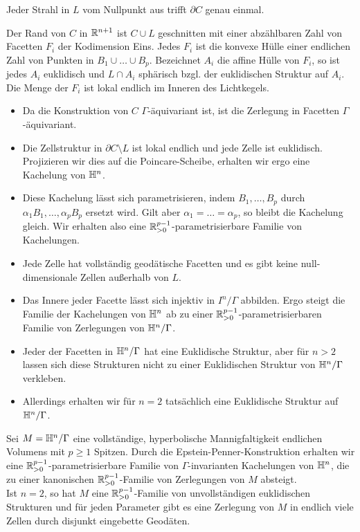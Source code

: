 \documentclass{book}
\begin{document}
\Lem{}
Jeder Strahl in $L$ vom Nullpunkt aus trifft $\partial C$ genau einmal.

\Prop{}
Der Rand von $C$ in $\mathbb{R}^{n+1}$ ist $C \cup L$ geschnitten mit einer abzählbaren Zahl von Facetten $F_i$ der Kodimension Eins. Jedes $F_i$ ist die konvexe Hülle einer endlichen Zahl von Punkten in $B_1\cup\ldots \cup B_p$. Bezeichnet $A_i$ die affine Hülle von $F_i$, so ist jedes $A_i$ euklidisch und $L\cap A_i$ sphärisch bzgl. der euklidischen Struktur auf $A_i$. Die Menge der $F_i$ ist lokal endlich im Inneren des Lichtkegels.

\Bem{}
\begin{itemize}
	\item Da die Konstruktion von $C$ $\Gamma$-äquivariant ist, ist die Zerlegung in Facetten $\Gamma$-äquivariant.
	\item Die Zellstruktur in $\partial C \setminus L$ ist lokal endlich und jede Zelle ist euklidisch. Projizieren wir dies auf die Poincare-Scheibe, erhalten wir ergo eine Kachelung von $\mathbb{H}^n$.
	\item Diese Kachelung lässt sich parametrisieren, indem $B_1,\ldots, B_p$ durch $\alpha_1B_1,\ldots, \alpha_p B_p$ ersetzt wird. Gilt aber $\alpha_1 = \ldots = \alpha_p$, so bleibt die Kachelung gleich. Wir erhalten also eine $\mathbb{R}_{> 0}^{p-1}$-parametrisierbare Familie von Kachelungen.
	\item Jede Zelle hat vollständig geodätische Facetten und es gibt keine null-dimensionale Zellen außerhalb von $L$.
	\item Das Innere jeder Facette lässt sich injektiv in $I^n / \Gamma$ abbilden. Ergo steigt die Familie der Kachelungen von $\mathbb{H}^n$ ab zu einer $\mathbb{R}_{> 0}^{p-1}$-parametrisierbaren Familie von Zerlegungen von $\mathbb{H}^n / \Gamma$.
	\item Jeder der Facetten in $\mathbb{H}^n / \Gamma$ hat eine Euklidische Struktur, aber für $n > 2$ lassen sich diese Strukturen nicht zu einer Euklidischen Struktur von $\mathbb{H}^n/\Gamma$ verkleben.
	\item Allerdings erhalten wir für $n = 2$ tatsächlich eine Euklidische Struktur auf $\mathbb{H}^n /\Gamma$.
\end{itemize}

\Satz{}
Sei $M = \mathbb{H}^n /\Gamma$ eine vollständige, hyperbolische Mannigfaltigkeit endlichen Volumens mit $p\geq 1$ Spitzen. Durch die Epstein-Penner-Konstruktion erhalten wir eine $\mathbb{R}_{>0}^{p-1}$-parametrisierbare Familie von $\Gamma$-invarianten Kachelungen von $\mathbb{H}^n$, die zu einer kanonischen $\mathbb{R}_{>0}^{p-1}$-Familie von Zerlegungen von $M$ absteigt.\\
Ist $n = 2$, so hat $M$ eine $\mathbb{R}_{>0}^{p-1}$-Familie von unvollständigen euklidischen Strukturen und für jeden Parameter gibt es eine Zerlegung von $M$ in endlich viele Zellen durch disjunkt eingebette Geodäten.
\end{document}
